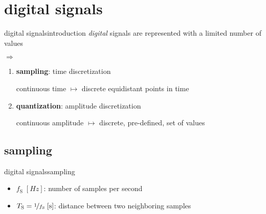     \section[digital signals]{digital signals}
        \begin{frame}{digital signals}{introduction}
            \textit{digital} signals are represented with a limited number of values
            \pause
            
            \bigskip
            $\Rightarrow$
            \begin{enumerate}
                \item	\textbf{sampling}: time discretization
                
                continuous time $\mapsto$ discrete equidistant points in time 
                
                
                \smallskip
                \item	\textbf{quantization}: amplitude discretization
                
                continuous amplitude $\mapsto$ discrete, pre-defined, set of values
            \end{enumerate}
        \end{frame}
        
        \subsection{sampling}
        \begin{frame}{digital signals}{sampling}
                
            \begin{itemize}
                \item   $f_\mathrm{S}\;[\unit{Hz}]$: number of samples per second
                \item   $T_\mathrm{S} = \nicefrac{1}{f_\mathrm{S}}\;[\unit{s}]$: distance between two neighboring samples
            \end{itemize}
        \end{frame}
            

